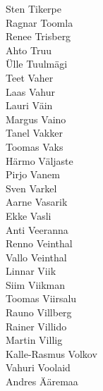 \begin{multicols}{3}
Sten Tikerpe\\
Ragnar Toomla\\
Renee Trisberg\\
Ahto Truu\\
Ülle Tuulmägi\\
Teet Vaher\\
Laas Vahur\\
Lauri Väin\\
Margus Vaino\\
Tanel Vakker\\
Toomas Vaks\\
Härmo Väljaste\\
Pirjo Vanem\\
Sven Varkel\\
Aarne Vasarik\\
Ekke Vasli\\
Anti Veeranna\\
Renno Veinthal\\
Vallo Veinthal\\
Linnar Viik\\
Siim Viikman\\
Toomas Viirsalu\\
Rauno Villberg\\
Rainer Villido\\
Martin Villig\\
Kalle-Rasmus Volkov\\
Vahuri Voolaid\\
Andres Ääremaa\\
\end{multicols}